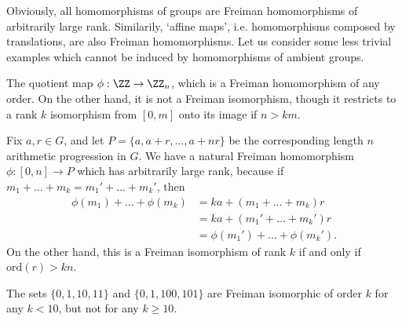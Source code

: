 Obviously, all homomorphisms of groups are Freiman homomorphisms of arbitrarily large rank. Similarily, `affine maps', i.e. homomorphisms composed by translations, are also Freiman homomorphisms. Let us consider some less trivial examples which cannot be induced by homomorphisms of ambient groups.

\begin{example}
    The quotient map $\phi: \ZZ \to \ZZ_n$, which is a Freiman homomorphism of any order. On the other hand, it is not a Freiman isomorphism, though it restricts to a rank $k$ isomorphism from $[0,m]$ onto its image if $n > km$.
\end{example}

\begin{example}
    Fix $a,r \in G$, and let $P = \{ a, a+r, \dots, a + nr \}$ be the corresponding length $n$ arithmetic progression in $G$. We have a natural Freiman homomorphism $\phi: [0,n] \to P$ which has arbitrarily large rank, because if $m_1 + \dots + m_k = m_1' + \dots + m_k'$, then
    \begin{align*}
        \phi(m_1) + \dots + \phi(m_k) &= ka + (m_1 + \dots + m_k) r\\
        &= ka + (m_1' + \dots + m_k') r\\
        &= \phi(m_1') + \dots + \phi(m_k').
    \end{align*}
    On the other hand, this is a Freiman isomorphism of rank $k$ if and only if $\text{ord}(r) > kn$.
\end{example}

\begin{example}
    The sets $\{ 0,1,10,11 \}$ and $\{ 0,1,100,101 \}$ are Freiman isomorphic of order $k$ for any $k < 10$, but not for any $k \geq 10$.
\end{example}

